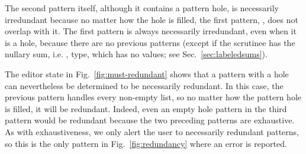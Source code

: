 The second pattern itself, although it contains a pattern hole, is necessarily irredundant because no matter how the hole is filled, the first pattern, \li{[]}, does not overlap with it. The first pattern is always necessarily irredundant, even when it is a hole, because
there are no previous patterns (except if the scrutinee has the nullary sum, i.e. , type, which has no values; see Sec.~\ref{sec:labeledsums}).

The editor state in Fig.~\ref{fig:must-redundant} shows that a pattern with a hole can nevertheless be determined to be necessarily redundant.
In this case, the previous pattern handles every non-empty list, so no matter how the pattern hole is filled, it will be redundant.
Indeed, even an empty hole pattern in the third pattern would be redundant because the two preceding patterns are exhaustive.
 As with exhaustiveness, we only alert
the user to necessarily redundant patterns, so this is the only pattern in Fig.~\ref{fig:redundancy} where an error is reported.

